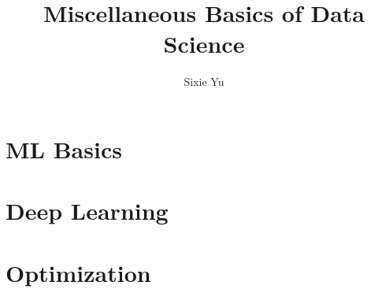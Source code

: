 \documentclass{article}
\title{Miscellaneous Basics of Data Science }
\author{Sixie Yu}
\date{ }
\begin{document}
\maketitle
\tableofcontents

\section{ML Basics}


\section{Deep Learning}



\section{Optimization}





\end{document}
